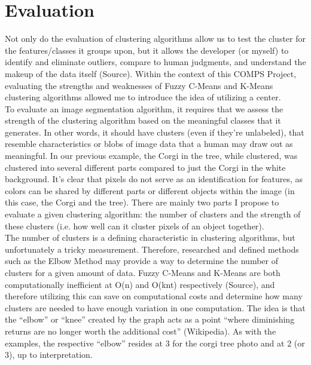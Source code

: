 \documentclass[10pt,twocolumn]{article}
\begin{document}
\section{Evaluation}

\indent Not only do the evaluation of clustering algorithms allow us to test the cluster for the features/classes it groups upon, but it allows the developer (or myself) to identify and eliminate outliers, compare to human judgments, and understand the makeup of the data itself (Source). Within the context of this COMPS Project, evaluating the strengths and weaknesses of Fuzzy C-Means and K-Means clustering algorithms allowed me to introduce the idea of utilizing a center.
\\
\indent
To evaluate an image segmentation algorithm, it requires that we assess the strength of the clustering algorithm based on the meaningful classes that it generates. In other words, it should have clusters (even if they’re unlabeled), that resemble characteristics or blobs of image data that a human may draw out as meaningful. In our previous example, the Corgi in the tree, while clustered, was clustered into several different parts compared to just the Corgi in the white background. It’s clear that pixels do not serve as an identification for features, as colors can be shared by different parts or different objects within the image (in this case, the Corgi and the tree). There are mainly two parts I propose to evaluate a given clustering algorithm: the number of clusters and the strength of these clusters (i.e. how well can it cluster pixels of an object together).
\\
\indent
The number of clusters is a defining characteristic in clustering algorithms, but unfortunately a tricky measurement. Therefore, researched and defined methods such as the Elbow Method may provide a way to determine the number of clusters for a given amount of data. Fuzzy C-Means and K-Means are both computationally inefficient at O(n) and O(knt) respectively (Source), and therefore utilizing this can save on computational costs and determine how many clusters are needed to have enough variation in one computation. The idea is that the “elbow” or “knee” created by the graph acts as a point “where diminishing returns are no longer worth the additional cost” (Wikipedia). As with the examples, the respective “elbow” resides at 3 for the corgi tree photo and at 2 (or 3), up to interpretation.
\end{document}
